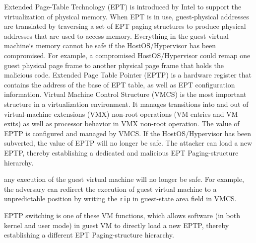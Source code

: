 \fi

\iffalse
In this paper, we introduce a novel scheme, named HyperPS, to implement hypervisor monitoring based on privilege separation without relying on any special hardware or reconstructing the hypervisor. The key idea of HyperPS is to separate the core virtualization privileges, especially the privileges of managing the physical memory, into an isolated execution environment alongside the HostOS kernel,
so that the security of virtual machines can be strongly protected, even if the HostOS/hypervisor has been compromised. Our isolated execution does not rely on a special hardware feature, nor demand a higher privilege level. Our isolated execution actually shares the same privilege level with the HostOS kernel. 
\fi
Extended Page-Table Technology (EPT) is introduced by Intel to support the virtualization of physical memory.
When EPT is in use, guest-physical addresses are translated by traversing a set of EPT paging structures to produce physical addresses that are used to access memory. Everything in the guest virtual machine`s memory cannot be safe if the HostOS/Hypervisor has been compromised. For example, a compromised HostOS/Hypervisor could remap one guest physical page frame to another physical page frame that holds the malicious code.
Extended Page Table Pointer (EPTP) is a hardware register that contains the address of the base of EPT table, as well as EPT configuration information. 
Virtual Machine Control Structure (VMCS) is the most important structure in a virtualization environment. It manages transitions into and out of virtual-machine extensions (VMX) non-root operations (VM entries and VM exits) as well as processor behavior in VMX non-root operation. 
The value of EPTP is configured and managed by VMCS. 
If the HostOS/Hypervisor has been subverted, the value of EPTP will no longer be safe. The attacker can load a new EPTP, thereby establishing a dedicated and malicious EPT Paging-structure hierarchy. 

\iffalse
any execution of the guest virtual machine will no longer be safe. 
For example, the adversary can redirect the execution of guest virtual machine to a unpredictable position by writing the \verb|rip| in guest-state area field in VMCS.

EPTP switching is one of these VM functions, which allows software (in both kernel and user mode) in guest VM to directly load a new EPTP, thereby establishing a different EPT Paging-structure hierarchy. 

